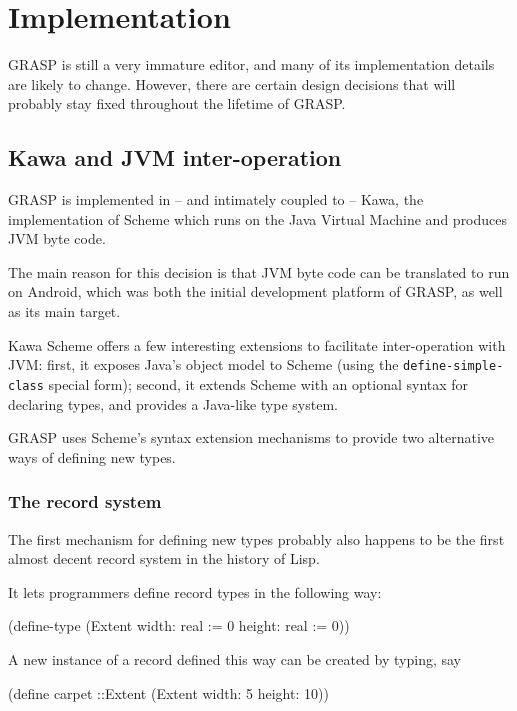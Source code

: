 \documentclass[sigconf]{acmart}
\newenvironment{Snippet}{\Verbatim[samepage=true]}{\endVerbatim}
\begin{document}
\section{Implementation}

GRASP is still a very immature editor, and many 
of its implementation details are likely to change. 
However, there are certain design decisions that
will probably stay fixed throughout the lifetime
of GRASP.

\subsection{Kawa and JVM inter-operation}

GRASP is implemented in -- and intimately coupled
to -- Kawa, the implementation of Scheme which runs
on the Java Virtual Machine and produces JVM byte code.

The main reason for this decision is that JVM
byte code can be translated to run on Android,
which was both the initial development platform
of GRASP, as well as its main target.

Kawa Scheme offers a few interesting extensions
to facilitate inter-operation with JVM: first,
it exposes Java's object model to Scheme
(using the \texttt{define-simple-class} special form);
second, it extends Scheme with an optional syntax
for declaring types, and provides a Java-like type
system.

GRASP uses Scheme's syntax extension mechanisms
to provide two alternative ways of defining new
types.

\subsubsection{The record system}

The first mechanism for defining new types 
probably also happens to be the first almost decent
record system in the history of Lisp.

It lets programmers define record types in the following
way:

\begin{Snippet}
(define-type (Extent width: real := 0
		     height: real := 0))
\end{Snippet}

A new instance of a record defined this way can be
created by typing, say

\begin{Snippet}
(define carpet ::Extent (Extent width: 5 height: 10))
\end{Snippet}
\end{document}
